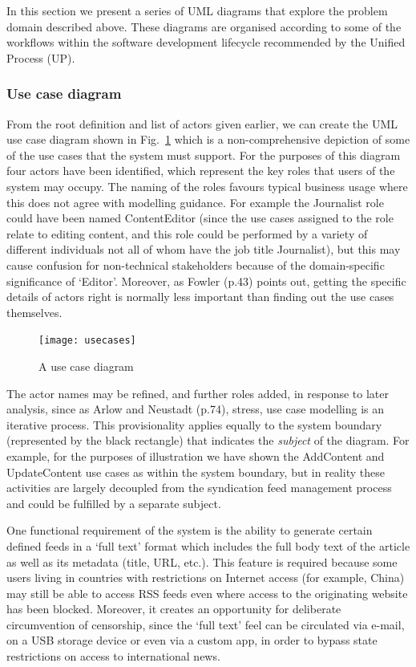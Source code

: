 \documentclass[runningheads,a4paper]{llncs}
\begin{document}
In this section we present a series of UML diagrams that explore the problem domain described above. These diagrams are organised according to some of the workflows within the software development lifecycle recommended by the Unified Process (UP).


\subsubsection{Use case diagram}

From the root definition and list of actors given earlier, we can create the UML use case diagram shown in Fig.~\ref{fig:use-cases} which is a non-comprehensive depiction of some of the use cases that the system must support. For the purposes of this diagram four actors have been identified, which represent the key roles that users of the system may occupy. The naming of the roles favours typical business usage where this does not agree with modelling guidance. For example the \textsf{Journalist} role could have been named \textsf{ContentEditor} (since the use cases assigned to the role relate to editing content, and this role could be performed by a variety of different individuals not all of whom have the job title \textsf{Journalist}), but this may cause confusion for non-technical stakeholders because of the domain-specific significance of `Editor'. Moreover, as Fowler \cite{fowler2000} (p.43) points out, getting the specific details of actors right is normally less important than finding out the use cases themselves.

\begin{figure}
\centering
\texttt{[image: usecases]}
\caption{A use case diagram}
\label{fig:use-cases}
\end{figure}

The actor names may be refined, and further roles added, in response to later analysis, since as Arlow and Neustadt \cite{arlow} (p.74), stress, use case modelling is an iterative process. This provisionality applies equally to the system boundary (represented by the black rectangle) that indicates the \textit{subject} of the diagram. For example, for the purposes of illustration we have shown the \textsf{AddContent} and \textsf{UpdateContent} use cases as within the system boundary, but in reality these activities are largely decoupled from the syndication feed management process and could be fulfilled by a separate subject.

One functional requirement of the system is the ability to generate certain defined feeds in a `full text' format which includes the full body text of the article as well as its metadata (title, URL, etc.). This feature is required because some users living in countries with restrictions on Internet access (for example, China) may still be able to access RSS feeds even where access to the originating website has been blocked. Moreover, it creates an opportunity for deliberate circumvention of censorship, since the `full text' feel can be circulated via e-mail, on a USB storage device or even via a custom app, in order to bypass state restrictions on access to international news.
\end{document}
